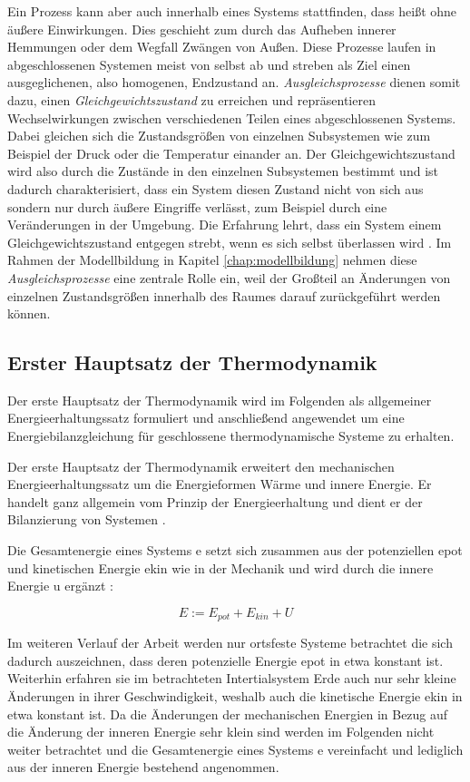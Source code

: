 Ein Prozess kann aber auch innerhalb eines Systems stattfinden, dass heißt ohne äußere Einwirkungen. Dies geschieht zum durch das Aufheben innerer Hemmungen oder dem Wegfall Zwängen von Außen. Diese Prozesse laufen in abgeschlossenen Systemen meist von selbst ab und streben als Ziel einen ausgeglichenen, also homogenen, Endzustand an. \textit{Ausgleichsprozesse} dienen somit dazu, einen \textit{Gleichgewichtszustand} zu erreichen und repräsentieren Wechselwirkungen zwischen verschiedenen Teilen eines abgeschlossenen Systems. Dabei gleichen sich die Zustandsgrößen von einzelnen Subsystemen wie zum Beispiel der Druck oder die Temperatur einander an. Der Gleichgewichtszustand wird also durch die Zustände in den einzelnen Subsystemen bestimmt und ist dadurch charakterisiert, dass ein System diesen Zustand nicht von sich aus sondern nur durch äußere Eingriffe verlässt, zum Beispiel durch eine Veränderungen in der Umgebung. Die Erfahrung lehrt, dass ein System einem Gleichgewichtszustand entgegen strebt, wenn es sich selbst überlassen wird \cite[S.22~f.]{ba12}.
Im Rahmen der Modellbildung in Kapitel \ref{chap:modellbildung} nehmen diese \textit{Ausgleichsprozesse} eine zentrale Rolle ein, weil der Großteil an Änderungen von einzelnen Zustandsgrößen innerhalb des Raumes darauf zurückgeführt werden können. 

\subsection{Erster Hauptsatz der Thermodynamik}
Der erste Hauptsatz der Thermodynamik wird im Folgenden als allgemeiner Energieerhaltungssatz formuliert und anschließend angewendet um eine Energiebilanzgleichung für geschlossene thermodynamische Systeme zu erhalten.

Der erste Hauptsatz der Thermodynamik erweitert den mechanischen Energieerhaltungssatz um die Energieformen Wärme und innere Energie. Er handelt ganz allgemein vom Prinzip der Energieerhaltung und  dient er der Bilanzierung von Systemen \cite[S.~43]{ba12}.

Die Gesamtenergie eines Systems \gls{e} setzt sich zusammen aus der potenziellen \gls{epot} und kinetischen Energie \gls{ekin} wie in der Mechanik und wird durch die innere Energie \gls{u} ergänzt \cite[S.~49]{ba12}:

\begin{equation}
\label{eq:energie}
E := E_{pot} + E_{kin} + U
\end{equation}

Im weiteren Verlauf der Arbeit werden nur ortsfeste Systeme betrachtet die sich dadurch auszeichnen, dass deren potenzielle Energie  \gls{epot} in etwa konstant ist. Weiterhin erfahren sie im betrachteten Intertialsystem Erde auch nur sehr kleine Änderungen in ihrer Geschwindigkeit, weshalb auch die kinetische Energie \gls{ekin} in etwa konstant ist.  Da die Änderungen der mechanischen Energien in Bezug auf die Änderung der inneren Energie sehr klein sind werden im Folgenden nicht weiter betrachtet und die Gesamtenergie eines Systems \gls{e} vereinfacht und lediglich aus der inneren Energie bestehend angenommen.

